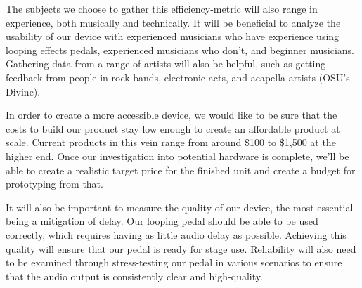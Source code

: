 \documentclass[onecolumn, draftclsnofoot,10pt, compsoc]{IEEEtran}
\begin{document}
The subjects we choose to gather this efficiency-metric will also range in experience, both musically and technically. It will be beneficial to analyze the usability of our device with experienced musicians who have experience using looping effects pedals, experienced musicians who don't, and beginner musicians. Gathering data from a range of artists will also be helpful, such as getting feedback from people in rock bands, electronic acts, and acapella artists (OSU's Divine).  

In order to create a more accessible device, we would like to be sure that the costs to build our product stay low enough to create an affordable product at scale. Current products in this vein range from around \$100 to \$1,500 at the higher end. Once our investigation into potential hardware is complete, we'll be able to create a realistic target price for the finished unit and create a budget for prototyping from that.

It will also be important to measure the quality of our device, the most essential being a mitigation of delay. Our looping pedal should be able to be used correctly, which requires having as little audio delay as possible. Achieving this quality will ensure that our pedal is ready for stage use. Reliability will also need to be examined through stress-testing our pedal in various scenarios to ensure that the audio output is consistently clear and high-quality.
\end{document}
